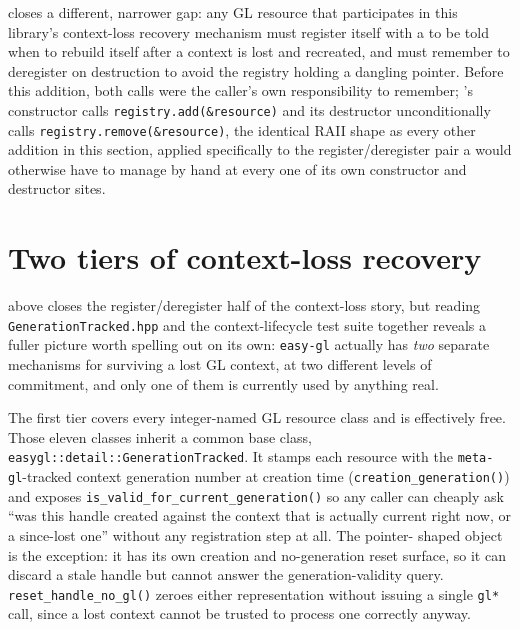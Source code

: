 closes a different, narrower gap: any GL resource that
participates in this library's context-loss recovery mechanism must register itself with a
 to be told when to rebuild itself after a context is lost and
recreated, and must remember to deregister on destruction to avoid the registry holding a
dangling pointer. Before this addition, both calls were the caller's own responsibility to
remember; 's constructor calls \texttt{registry.add(\&resource)}
and its destructor unconditionally calls \texttt{registry.remove(\&resource)}, the identical
RAII shape as every other addition in this section, applied specifically to the
register/deregister pair a  would otherwise have to manage by
hand at every one of its own constructor and destructor sites.

\section{Two tiers of context-loss recovery}

 above closes the register/deregister half of the context-loss
story, but reading \texttt{GenerationTracked.hpp} and the context-lifecycle test suite together
reveals a fuller picture worth spelling out on its own: \texttt{easy-gl} actually has
\emph{two} separate mechanisms for surviving a lost GL context, at two different levels of
commitment, and only one of them is currently used by anything real.

The first tier covers every integer-named GL resource class and is effectively free. Those
eleven classes inherit a common base class,
\texttt{easygl::\allowbreak{}detail::\allowbreak{}GenerationTracked}. It stamps each
resource with the \texttt{meta-gl}-tracked context generation number at creation time
(\texttt{creation\_generation()}) and exposes \texttt{is\_valid\_for\_current\_generation()} so
any caller can cheaply ask ``was this handle created against the context that is actually
current right now, or a since-lost one'' without any registration step at all. The pointer-
shaped  object is the exception: it has its own creation and no-generation reset
surface, so it can discard a stale handle but cannot answer the generation-validity query.
\texttt{reset\_handle\_no\_gl()} zeroes either representation without issuing a single
\texttt{gl*} call, since a lost context cannot be trusted to process one correctly anyway.

